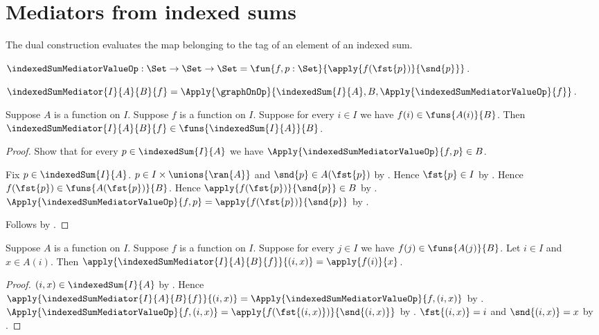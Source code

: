\section{Mediators from indexed sums}

The dual construction evaluates the map belonging to the tag of an element
of an indexed sum.

\begin{definition}\label{indexed_sum_mediator_value_op}
    $\indexedSumMediatorValueOp:\Set\to\Set\to\Set
        =\fun{f,p:\Set}{\apply{f(\fst{p})}{\snd{p}}}$.
\end{definition}

\begin{definition}\label{indexed_sum_mediator}
    $\indexedSumMediator{I}{A}{B}{f}
        =\Apply{\graphOnOp}{
            \indexedSum{I}{A},B,
            \Apply{\indexedSumMediatorValueOp}{f}}$.
\end{definition}

\begin{proposition}\label{indexed_sum_mediator_type}
    Suppose $A$ is a function on $I$.
    Suppose $f$ is a function on $I$.
    Suppose for every $i\in I$ we have $f(i)\in\funs{A(i)}{B}$.
    Then $\indexedSumMediator{I}{A}{B}{f}
        \in\funs{\indexedSum{I}{A}}{B}$.
\end{proposition}
\begin{proof}
    Show that for every $p\in\indexedSum{I}{A}$ we have
        $\Apply{\indexedSumMediatorValueOp}{f,p}\in B$.
    \begin{subproof}
        Fix $p\in\indexedSum{I}{A}$.
        $p\in I\times\unions{\ran{A}}$ and
            $\snd{p}\in A(\fst{p})$ by .
        Hence $\fst{p}\in I$ by .
        Hence $f(\fst{p})\in\funs{A(\fst{p})}{B}$.
        Hence $\apply{f(\fst{p})}{\snd{p}}\in B$ by
            .
        $\Apply{\indexedSumMediatorValueOp}{f,p}
            =\apply{f(\fst{p})}{\snd{p}}$ by
            .
    \end{subproof}
    Follows by
        .
\end{proof}

\begin{proposition}\label{indexed_sum_mediator_apply}
    Suppose $A$ is a function on $I$.
    Suppose $f$ is a function on $I$.
    Suppose for every $j\in I$ we have $f(j)\in\funs{A(j)}{B}$.
    Let $i\in I$ and $x\in A(i)$.
    Then $\apply{\indexedSumMediator{I}{A}{B}{f}}{(i,x)}
        =\apply{f(i)}{x}$.
\end{proposition}
\begin{proof}
    $(i,x)\in\indexedSum{I}{A}$ by .
    Hence $\apply{\indexedSumMediator{I}{A}{B}{f}}{(i,x)}
        =\Apply{\indexedSumMediatorValueOp}{f,(i,x)}$ by
        .
    $\Apply{\indexedSumMediatorValueOp}{f,(i,x)}
        =\apply{f(\fst{(i,x)})}{\snd{(i,x)}}$ by
        .
    $\fst{(i,x)}=i$ and $\snd{(i,x)}=x$ by .
\end{proof}

